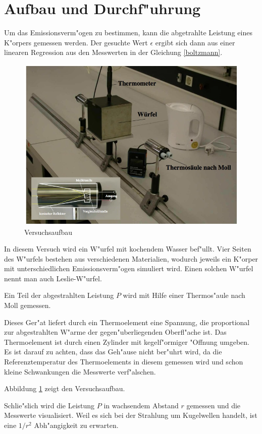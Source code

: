 \section{Aufbau und Durchf"uhrung}
	\label{sec:durchfuehrung}

	Um das Emissionsverm"ogen zu bestimmen, kann die abgetrahlte Leistung eines K"orpers gemessen werden.
	Der gesuchte Wert $\epsilon$ ergibt sich dann aus einer linearen Regression aus den Messwerten in der Gleichung \eqref{boltzmann}.

	\begin{figure}[h!]
		\centering
		\includegraphics[width = 15cm]{img/aufbau.JPG}
		\caption{Versuchsaufbau}
		\label{fig:aufbau}
	\end{figure}

	In diesem Versuch wird ein W"urfel mit kochendem Wasser bef"ullt.
	Vier Seiten des W"urfels bestehen aus verschiedenen Materialien, wodurch jeweils ein K"orper mit unterschiedlichen Emissionsverm"ogen simuliert wird.
	Einen solchen W"urfel nennt man auch Leslie-W"urfel.

	Ein Teil der abgestrahlten Leistung $P$ wird mit Hilfe einer Thermos"aule nach Moll gemessen.

	Dieses Ger"at liefert durch ein Thermoelement eine Spannung, die proportional zur ab\-ge\-strahl\-ten W"arme der gegen"uberliegenden Oberfl"ache ist.
	Das Thermoelement ist durch einen Zylinder mit kegelf"ormiger "Offnung umgeben.
	Es ist darauf zu achten, dass das Geh"ause nicht ber"uhrt wird, da die Referenztemperatur des Thermoelements in diesem gemessen wird und schon kleine Schwankungen die Messwerte verf"alschen.

	Abbildung \ref{fig:aufbau} zeigt den Versuchsaufbau.


	Schlie"slich wird die Leistung $P$ in wachsendem Abstand $r$ gemessen und die Messwerte visualisiert.
	Weil es sich bei der Strahlung um Kugelwellen handelt, ist eine $1 / r^2$ Ab\-h"an\-gig\-keit zu erwarten.